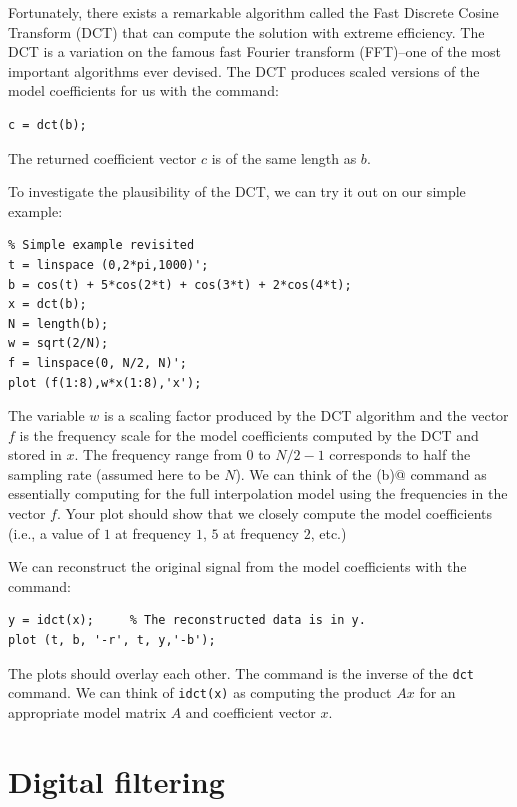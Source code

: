 \documentclass[10pt]{article}
\begin{document}
Fortunately, there exists a remarkable algorithm called the Fast Discrete
Cosine Transform (DCT) that can compute the solution with extreme efficiency.
The DCT is a variation on the famous fast Fourier transform (FFT)--one of the
most important algorithms ever devised. The DCT produces scaled versions of the
model coefficients for us with the command:
\begin{verbatim}
c = dct(b);
\end{verbatim}
The returned coefficient vector $c$ is of the same length as $b$. 

To investigate the plausibility of the DCT, we can try it out on our
simple example:
\begin{verbatim}
% Simple example revisited
t = linspace (0,2*pi,1000)';
b = cos(t) + 5*cos(2*t) + cos(3*t) + 2*cos(4*t);
x = dct(b);
N = length(b);
w = sqrt(2/N);
f = linspace(0, N/2, N)';
plot (f(1:8),w*x(1:8),'x');
\end{verbatim}
The variable $w$ is a scaling factor produced by the DCT algorithm and
the vector $f$ is the frequency scale for the model coefficients 
computed by the DCT and stored in $x$.
The frequency range from $0$ to $N/2 - 1$ corresponds to half
the sampling rate (assumed here to be $N$).
We can think of the \verb@dct(b)@ command as essentially computing
\verb@A\b@ for the full interpolation model using the frequencies
in the vector $f$.
Your plot should show that we closely compute the model coefficients 
(i.e., a value of $1$ at frequency $1$, $5$ at frequency $2$, etc.)

We can reconstruct the original signal from the model coefficients with
the command:
\begin{verbatim}
y = idct(x);     % The reconstructed data is in y.
plot (t, b, '-r', t, y,'-b');
\end{verbatim}
The plots should overlay each other. The \verb@idct@ command is the inverse
of the {\tt dct} command. We can think of {\tt idct(x)} as 
computing the product $Ax$ for an appropriate model matrix $A$ and
coefficient vector $x$.




\section*{Digital filtering}
\end{document}
